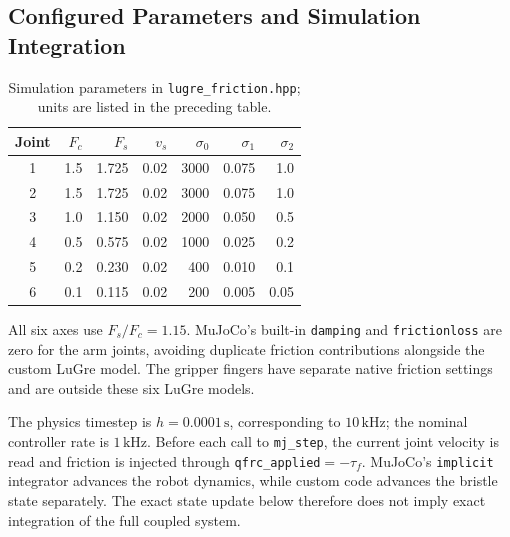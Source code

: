 \documentclass[11pt,a4paper]{report}
\begin{document}
\subsection{Configured Parameters and Simulation Integration}
\begin{table}[htbp]
\centering
\caption{Simulation parameters in \texttt{lugre\_friction.hpp}; units are listed in the preceding table.}
\begin{tabular}{crrrrrr}
\toprule
Joint & $F_c$ & $F_s$ & $v_s$ & $\sigma_0$ & $\sigma_1$ & $\sigma_2$\\
\midrule
1 & 1.5 & 1.725 & 0.02 & 3000 & 0.075 & 1.0\\
2 & 1.5 & 1.725 & 0.02 & 3000 & 0.075 & 1.0\\
3 & 1.0 & 1.150 & 0.02 & 2000 & 0.050 & 0.5\\
4 & 0.5 & 0.575 & 0.02 & 1000 & 0.025 & 0.2\\
5 & 0.2 & 0.230 & 0.02 & 400 & 0.010 & 0.1\\
6 & 0.1 & 0.115 & 0.02 & 200 & 0.005 & 0.05\\
\bottomrule
\end{tabular}
\end{table}
All six axes use $F_s/F_c=1.15$. MuJoCo's built-in \texttt{damping} and \texttt{frictionloss} are zero for the arm joints, avoiding duplicate friction contributions alongside the custom LuGre model. The gripper fingers have separate native friction settings and are outside these six LuGre models.

The physics timestep is $h=0.0001\,\mathrm{s}$, corresponding to $10\,\mathrm{kHz}$; the nominal controller rate is $1\,\mathrm{kHz}$. Before each call to \texttt{mj\_step}, the current joint velocity is read and friction is injected through \texttt{qfrc\_applied}$=-\tau_f$. MuJoCo's \texttt{implicit} integrator advances the robot dynamics, while custom code advances the bristle state separately. The exact state update below therefore does not imply exact integration of the full coupled system.
\end{document}
